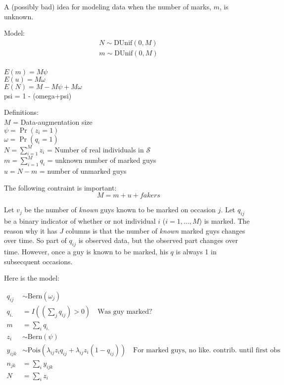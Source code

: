 \documentclass[12pt]{article}
\begin{document}
A (possibly bad) idea for modeling data when the number of marks, $m$, is
unknown. %

\vspace{1cm}

Model:
\begin{align*}
  N \sim \text{DUnif}(0, M) \\
  m \sim \text{DUnif}(0, M) \\
\end{align*}


$E(m) = M\psi$ \\
$E(u) = M\omega$ \\
$E(N) = M - M\psi + M\omega$ \\
psi = 1 - (omega+psi)

Definitions: \\
$M$ = Data-augmentation size \\
$\psi = \Pr(z_i=1)$ \\ %
$\omega = \Pr(q_i=1)$ \\
$N = \sum_{i=1}^M z_i$ = Number of real individuals in $\mathcal{S}$ \\
$m = \sum_{i=1}^M q_i$ = unknown number of marked guys \\
$u = N - m$ = number of unmarked guys

\vspace{1cm}

The following contraint is important:
\[
M = m + u + fakers
\]


\newpage

Let $v_j$ be the number of \textit{known} guys known to be marked on
occasion $j$. Let $q_{ij}$ be a binary indicator of whether or not individual $i$
($i=1,\ldots,M$) is marked. The reason why it has $J$ columns is that
the number of \textit{known} marked guys changes over time. So part of
$q_{ij}$ is observed data, but the observed part changes over time.
However, once a
guy is known to be marked, his $q$ is always 1 in subsecquent occasions.

Here is the model:

\begin{align*}
q_{ij} &\sim \text{Bern}(\omega_j) \\
q_{i.} &= I((\sum_j q_{ij})>0) \quad \text{Was guy marked?}\\
m &= \sum_i q_{i.} \\
z_i &\sim \text{Bern}(\psi) \\
y_{ijk} &\sim
\text{Pois}(\lambda_{ij}z_{i}q_{ij} + \lambda_{ij}z_i(1-q_{ij})) \quad
\text{For marked guys, no like. contrib. until first obs}\\
n_{jk} &= \sum_i y_{ijk} \\
N &= \sum_i z_i
\end{align*}
\end{document}
